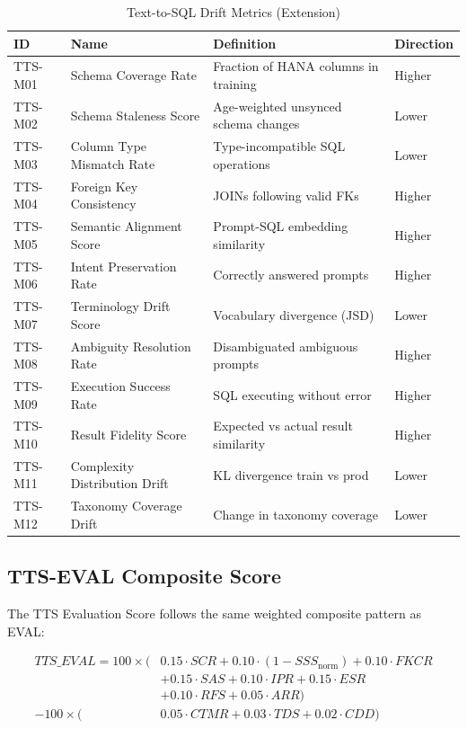 \begin{table}[htbp]
\centering
\footnotesize
\caption{Text-to-SQL Drift Metrics (Extension)}
\label{tab:tts-metrics-summary}
\begin{tabularx}{\textwidth}{@{}l l X l@{}}
\toprule
\textbf{ID} & \textbf{Name} & \textbf{Definition} & \textbf{Direction} \\
\midrule
TTS-M01 & Schema Coverage Rate & Fraction of HANA columns in training & Higher \\
TTS-M02 & Schema Staleness Score & Age-weighted unsynced schema changes & Lower \\
TTS-M03 & Column Type Mismatch Rate & Type-incompatible SQL operations & Lower \\
TTS-M04 & Foreign Key Consistency & JOINs following valid FKs & Higher \\
TTS-M05 & Semantic Alignment Score & Prompt-SQL embedding similarity & Higher \\
TTS-M06 & Intent Preservation Rate & Correctly answered prompts & Higher \\
TTS-M07 & Terminology Drift Score & Vocabulary divergence (JSD) & Lower \\
TTS-M08 & Ambiguity Resolution Rate & Disambiguated ambiguous prompts & Higher \\
TTS-M09 & Execution Success Rate & SQL executing without error & Higher \\
TTS-M10 & Result Fidelity Score & Expected vs actual result similarity & Higher \\
TTS-M11 & Complexity Distribution Drift & KL divergence train vs prod & Lower \\
TTS-M12 & Taxonomy Coverage Drift & Change in taxonomy coverage & Lower \\
\bottomrule
\end{tabularx}
\end{table}

\subsection{TTS-EVAL Composite Score}

The TTS Evaluation Score follows the same weighted composite pattern as EVAL:

\begin{equation}
\boxed{
\begin{aligned}
TTS\_EVAL = 100 \times \Big(
  &0.15 \cdot SCR +
  0.10 \cdot (1 - SSS_{\text{norm}}) +
  0.10 \cdot FKCR \\
  &+ 0.15 \cdot SAS +
  0.10 \cdot IPR +
  0.15 \cdot ESR \\
  &+ 0.10 \cdot RFS +
  0.05 \cdot ARR
\Big) \\
- 100 \times \Big(
  &0.05 \cdot CTMR +
  0.03 \cdot TDS +
  0.02 \cdot CDD
\Big)
\end{aligned}
}
\end{equation}

